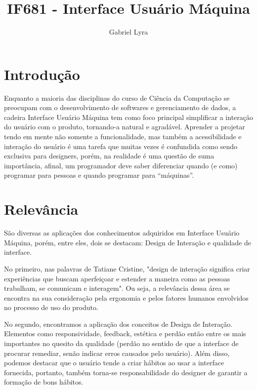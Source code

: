 \documentclass[a4paper]{article}
\title{IF681 - Interface Usuário Máquina}
\author{Gabriel Lyra}
\begin{document}
\maketitle



\section{Introdução}

Enquanto a maioria das disciplinas do curso de Ciência da Computação se preocupam com o desenvolvimento de softwares e gerenciamento de dados, a cadeira Interface Usuário Máquina tem como foco principal simplificar a interação do usuário com o produto, tornando-a natural e agradável.  Aprender a projetar tendo em mente não somente a funcionalidade, mas também a acessibilidade e interação do usuário é uma tarefa que muitas vezes é confundida como sendo exclusiva para designers, porém, na realidade é uma questão de suma importância, afinal, um programador deve saber diferenciar quando (e como) programar para pessoas e quando programar para “máquinas”.
 
 
 
\section{Relevância}

São diversas as aplicações dos conhecimentos adquiridos em Interface Usuário Máquina, porém, entre eles, dois se destacam: Design de Interação e qualidade de interface.

No primeiro, nas palavras de Tatiane Cristine, "design de interação significa criar experiências que buscam aperfeiçoar e
estender a maneira como as pessoas trabalham, se comunicam e interagem". Ou seja, a relevância dessa área se encontra na sua consideração pela ergonomia e pelos fatores humanos envolvidos no processo de uso do produto.

No segundo, encontramos a aplicação dos conceitos de Design de Interação. Elementos como responsividade, feedback, estética e perdão então entre os mais importantes no quesito da qualidade (perdão no sentido de que a interface de procurar remediar, senão indicar erros causados pelo usuário). Além disso, podemos destacar que o usuário tende a criar hábitos ao usar a interface fornecida, portanto, também torna-se responsabilidade do designer de garantir a formação de bons hábitos. 
\end{document}
